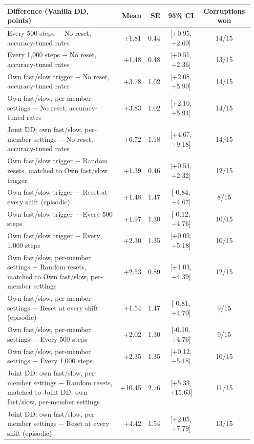 \begin{table}[t]
  \centering\small
  \begin{tabular}{@{}lrrcc@{}}
    \toprule
    Difference (Vanilla DD, points) & Mean & SE & 95\% CI & Corruptions won \\
    \midrule
    Every 500 steps $-$ No reset, accuracy-tuned rates & +1.81 & 0.44 & [+0.95, +2.60] & 14/15 \\
    Every 1,000 steps $-$ No reset, accuracy-tuned rates & +1.48 & 0.48 & [+0.51, +2.36] & 13/15 \\
    Own fast/slow trigger $-$ No reset, accuracy-tuned rates & +3.78 & 1.02 & [+2.08, +5.90] & 14/15 \\
    Own fast/slow, per-member settings $-$ No reset, accuracy-tuned rates & +3.83 & 1.02 & [+2.10, +5.94] & 14/15 \\
    Joint DD: own fast/slow, per-member settings $-$ No reset, accuracy-tuned rates & +6.72 & 1.18 & [+4.67, +9.18] & 14/15 \\
    Own fast/slow trigger $-$ Random resets, matched to Own fast/slow trigger & +1.39 & 0.46 & [+0.54, +2.32] & 12/15 \\
    Own fast/slow trigger $-$ Reset at every shift (episodic) & +1.48 & 1.47 & [-0.84, +4.67] & 8/15 \\
    Own fast/slow trigger $-$ Every 500 steps & +1.97 & 1.30 & [-0.12, +4.76] & 10/15 \\
    Own fast/slow trigger $-$ Every 1,000 steps & +2.30 & 1.35 & [+0.09, +5.18] & 10/15 \\
    Own fast/slow, per-member settings $-$ Random resets, matched to Own fast/slow, per-member settings & +2.53 & 0.89 & [+1.03, +4.39] & 12/15 \\
    Own fast/slow, per-member settings $-$ Reset at every shift (episodic) & +1.54 & 1.47 & [-0.81, +4.70] & 9/15 \\
    Own fast/slow, per-member settings $-$ Every 500 steps & +2.02 & 1.30 & [-0.10, +4.76] & 9/15 \\
    Own fast/slow, per-member settings $-$ Every 1,000 steps & +2.35 & 1.35 & [+0.12, +5.18] & 10/15 \\
    Joint DD: own fast/slow, per-member settings $-$ Random resets, matched to Joint DD: own fast/slow, per-member settings & +10.45 & 2.76 & [+5.33, +15.63] & 11/15 \\
    Joint DD: own fast/slow, per-member settings $-$ Reset at every shift (episodic) & +4.42 & 1.54 & [+2.05, +7.79] & 13/15 \\

\end{tabular}
\end{table}
